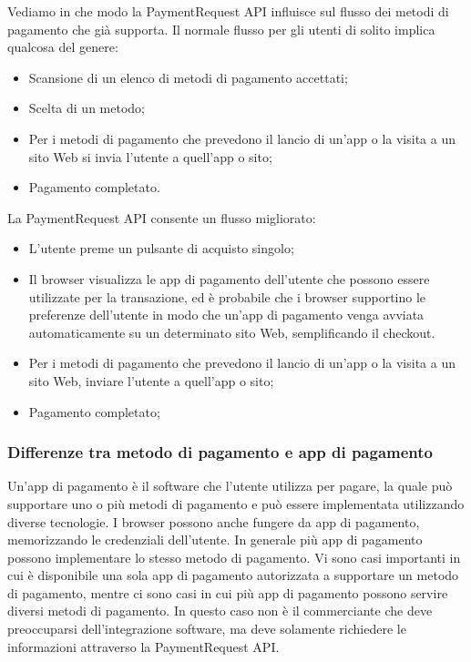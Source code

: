 \documentclass[italian]{article}
\begin{document}
	Vediamo in che modo la PaymentRequest API influisce sul flusso dei metodi di pagamento che già supporta. Il normale flusso per gli utenti di solito implica qualcosa del genere:
	\begin{itemize}
	\item Scansione di un elenco di metodi di pagamento accettati;
	\item Scelta di un metodo;
	\item Per i metodi di pagamento che prevedono il lancio di un'app o la visita a un sito Web si invia l'utente a quell'app o sito;
	\item Pagamento completato.
	\end{itemize}
	La PaymentRequest API consente un flusso migliorato:
	\begin{itemize}
	\item L'utente preme un pulsante di acquisto singolo;
	\item Il browser visualizza le app di pagamento dell'utente che possono essere utilizzate per la transazione, ed è probabile che i browser supportino le preferenze dell'utente in modo che un'app di pagamento venga avviata automaticamente su un determinato sito Web, semplificando il checkout.
	\item Per i metodi di pagamento che prevedono il lancio di un'app o la visita a un sito Web, inviare l'utente a quell'app o sito; 
	\item Pagamento completato; 
	\end{itemize}
	
	
	\subsubsection{Differenze tra metodo di pagamento e app di pagamento}
	Un'app di pagamento è il software che l'utente utilizza per pagare, la quale può supportare uno o più metodi di pagamento e può essere implementata utilizzando diverse tecnologie. I browser possono anche fungere da app di pagamento, memorizzando le credenziali dell'utente. In generale più app di pagamento possono implementare lo stesso metodo di pagamento. 
	Vi sono casi importanti in cui è disponibile una sola app di pagamento autorizzata a supportare un metodo di pagamento, mentre ci sono casi in cui più app di pagamento possono servire diversi metodi di pagamento. In questo caso non è il commerciante che deve preoccuparsi dell'integrazione software, ma deve solamente richiedere le informazioni attraverso la PaymentRequest API.
	\pagebreak
	
\end{document}
